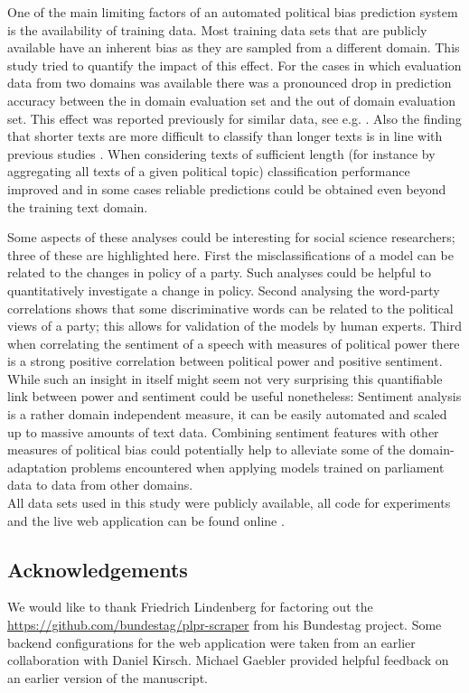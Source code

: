 \documentclass[11pt]{article}
\begin{document}
One of the main limiting factors of an automated political bias prediction system is the availability of training data. Most training data sets that are publicly available have an inherent bias as they are sampled from a different domain. This study tried to quantify the impact of this effect.
For the cases in which evaluation data from two domains was available there was a pronounced drop in prediction accuracy between the in domain evaluation set and the out of domain evaluation set. This effect was reported previously for similar data, see e.g. \cite{Yu2008}. Also the finding that shorter texts are more difficult to classify than longer texts is in line with previous studies \cite{Hirst2014}. When considering texts of sufficient length (for instance by aggregating all texts of a given political topic) classification performance improved and in some cases reliable predictions could be obtained even beyond the training text domain.

Some aspects of these analyses could be interesting for social science researchers; three of these are highlighted here.
First the misclassifications of a model can be related to the changes in policy of a party. Such analyses could be helpful to quantitatively investigate a change in policy. Second analysing the word-party correlations shows that some discriminative words can be related to the political views of a party; this allows for validation of the models by human experts. Third when correlating the sentiment of a speech with measures of political power there is a strong positive correlation between political power and positive sentiment. While such an insight in itself might seem not very surprising this quantifiable link between power and sentiment could be useful nonetheless: Sentiment analysis is a rather domain independent measure, it can be easily automated and scaled up to massive amounts of text data. Combining sentiment features with other measures of political bias could potentially help to alleviate some of the domain-adaptation problems encountered when applying models trained on parliament data to data from other domains. \\


All data sets used in this study were publicly available, all code for experiments and the live web application can be found online \cite{fipi, fipidemo}.

\subsection*{Acknowledgements}
We would like to thank Friedrich Lindenberg for factoring out the \url{https://github.com/bundestag/plpr-scraper} from his Bundestag project. Some backend configurations for the web application were taken from an earlier collaboration with Daniel Kirsch. Michael Gaebler provided helpful feedback on an earlier version of the manuscript. 
%
\small{


}
\end{document}
